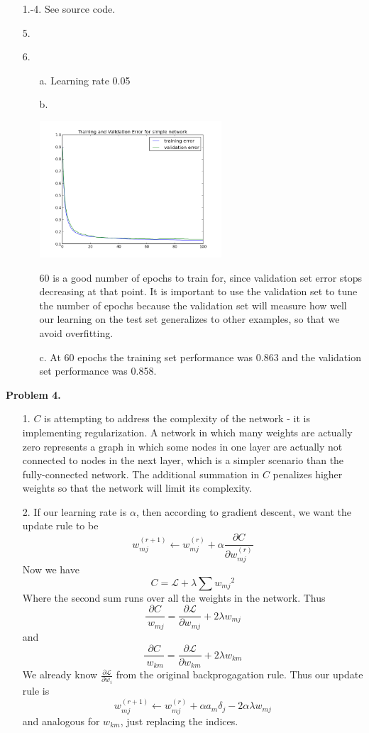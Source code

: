 \documentclass[12pt]{amsart}
\theoremstyle{remark}
\begin{document}
\begin{itemize}
\item[1.-4.] See source code.

\item[5.]

\item[6.]
\begin{itemize}
\item[a.] Learning rate 0.05
\item[b.] 

\includegraphics[height =2in]{simple100_005}

60 is a good number of epochs to train for, since validation set error stops decreasing at that point. It is important to use the validation set to tune the number of epochs because the validation set will measure how well our learning on the test set generalizes to other examples, so that we avoid overfitting.

\item[c.] At 60 epochs the training set performance was 0.863 and the validation set performance was 0.858.

\end{itemize}

\end{itemize}
\noindent \textbf{Problem 4.}

\begin{itemize}

\item[1.]
$C$ is attempting to address the complexity of the network - it is implementing regularization. A network in which many weights are actually zero represents a graph in which some nodes in one layer are actually not connected to nodes in the next layer, which is a simpler scenario than the fully-connected network. The additional summation in $C$ penalizes higher weights so that the network will limit its complexity.

\item[2.]
If our learning rate is $\alpha$, then according to gradient descent, we want the update rule to be 
\[
w_{mj}^{(r+1)} \leftarrow w_{mj}^{(r)} + \alpha \frac{\partial C}{\partial w_{mj}^{(r)}}
\]
Now we have
\[
C=\mathcal{L}+\lambda \sum {w_{mj}}^2
\]
Where the second sum runs over all the weights in the network.
Thus
\[
\frac{\partial C}{\ w_{mj}} = \frac{\partial \mathcal{L}}{\partial w_{mj}}+2\lambda w_{mj}
\]
and 
\[
\frac{\partial C}{\ w_{km}} = \frac{\partial \mathcal{L}}{\partial w_{km}}+2\lambda w_{km}
\]
We already know $\frac{\partial \mathcal{L}}{\partial w_i}$ from the original backprogagation rule. Thus our update rule is
\[
w_{mj}^{(r+1)} \leftarrow w_{mj}^{(r)}+\alpha a_{m}\delta_j-2\alpha\lambda w_{mj}
\]
and analogous for $w_{km}$, just replacing the indices. 
\end{itemize}
\end{document}
